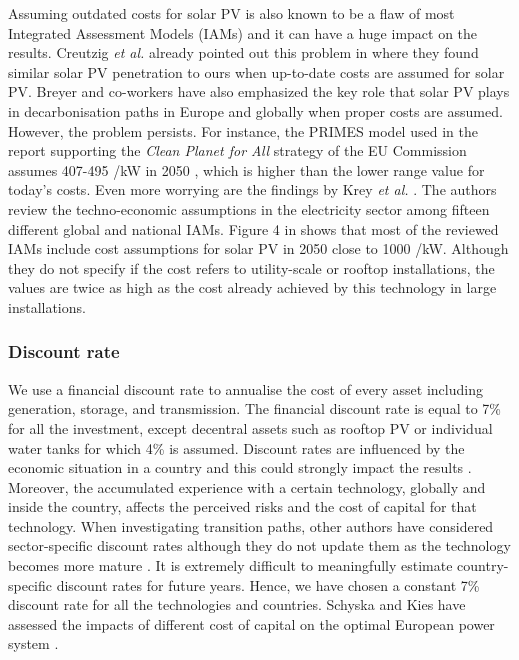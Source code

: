 \documentclass[3p]{elsarticle} %
\begin{document}
Assuming outdated costs for solar PV is also known to be a flaw of most Integrated Assessment Models (IAMs) and it can have a huge impact on the results. Creutzig \textit{et al.} already pointed out this problem in \cite{Creutzig_2017} where they found similar solar PV penetration to ours when up-to-date costs are assumed for solar PV. Breyer and co-workers have also emphasized the key role that solar PV plays in decarbonisation paths in Europe \cite{Child_2019} and globally \cite{Bogdanov_2019} when proper costs are assumed. However, the problem persists. For instance, the PRIMES model used in the report supporting the \textit{Clean Planet for All} strategy of the EU Commission \cite{in-depth_2018} assumes 407-495 \EUR/kW in 2050 \cite{in-depth-data}, which is higher than the lower range value for today's costs. Even more worrying are the findings by Krey \textsl{et al.} \cite{Krey_2019}. The authors review the techno-economic assumptions in the electricity sector among fifteen different global and national IAMs. Figure 4 in \cite{Krey_2019} shows that most of the reviewed IAMs include cost assumptions for solar PV in 2050 close to 1000 \EUR/kW. Although they do not specify if the cost refers to utility-scale or rooftop installations, the values are twice as high as the cost already achieved by this technology in large installations. 

\subsubsection{Discount rate}

We use a financial discount rate to annualise the cost of every asset including generation, storage, and transmission. The financial discount rate is equal to 7\% for all the investment, except decentral assets such as rooftop PV or individual water tanks for which 4\% is assumed. Discount rates are influenced by the economic situation in a country and this could strongly impact the results \cite{Egli_2019}. Moreover, the accumulated experience with a certain technology, globally and inside the country, affects the perceived risks and the cost of capital for that technology. When investigating transition paths, other authors have considered sector-specific discount rates although they do not update them as the technology becomes more mature \cite{in-depth_2018}. It is extremely difficult to meaningfully estimate country-specific discount rates for future years. Hence, we have chosen a constant 7\% discount rate for all the technologies and countries. Schyska and Kies have assessed the impacts of different cost of capital on the optimal European power system \cite{Schyska_2020}. \\
\end{document}
